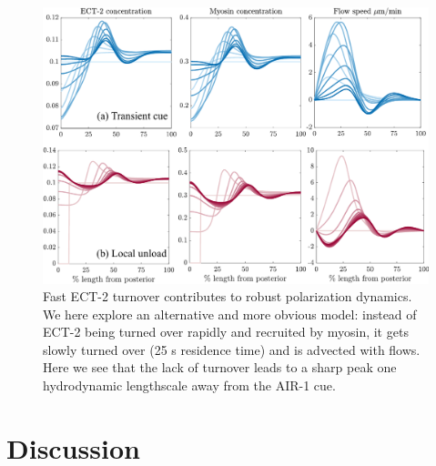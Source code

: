 \documentclass[11pt]{article}
\begin{document}
\begin{figure}
\centering
\includegraphics[width=\textwidth]{Glotzer/Fig7/Fig7-crop.pdf}
\caption{\label{fig:EctTurn}Fast ECT-2 turnover contributes to robust polarization dynamics. We here explore an alternative and more obvious model: instead of ECT-2 being turned over rapidly and recruited by myosin, it gets slowly turned over (25 s residence time) and is advected with flows. Here we see that the lack of turnover leads to a sharp peak one hydrodynamic lengthscale away from the AIR-1 cue. }
\end{figure}


\section{Discussion}
\end{document}
